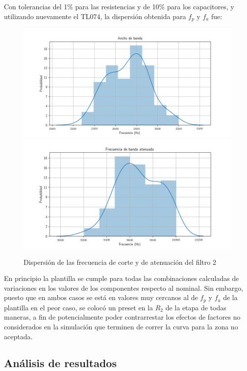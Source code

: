 \documentclass[../../tc_tp5_main.tex]{subfiles}
\begin{document}
Con tolerancias del 1\% para las resistencias y de 10\% para los capacitores, y utilizando nuevamente el TL074, la dispersi\'on obtenida para $f_p$ y $f_a$ fue:

\begin{figure}[H]
	\centering
	\includegraphics[scale=0.7]{imagenes/bes_hist_bw.png}
	\includegraphics[scale=0.7]{imagenes/bes_hist_fa.png}
	\caption{Dispersi\'on de las frecuencia de corte y de atenuaci\'on del filtro 2}
\end{figure}

En principio la plantilla se cumple para todas las combinaciones calculadas de variaciones en los valores de los componentes respecto al nominal. Sin embargo, puesto que en ambos casos se est\'a en valores muy cercanos al de $f_p$ y $f_a$ de la plantilla en el peor caso, se coloc\'o un preset en la $R_2$ de la etapa de todas maneras, a fin de potencialmente poder contrarrestar los efectos de factores no considerados en la simulaci\'on que terminen de correr la curva para la zona no aceptada. \par


\subsection{An\'alisis de resultados}
\end{document}

